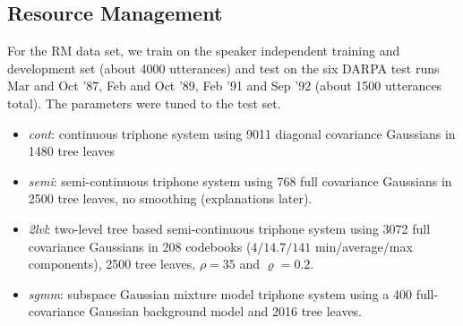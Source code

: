 \documentclass{article}
\begin{document}
\subsection{Resource Management}
For the RM data set, we train on the speaker independent training and development 
set (about 4000 utterances) and test on the six DARPA test runs Mar and Oct '87,
Feb and Oct '89, Feb '91 and Sep '92 (about 1500 utterances total).  The parameters 
were tuned to the test set.
%
\begin{itemize}
\item
  {\em cont}: continuous triphone system using 9011 diagonal covariance
  Gaussians in 1480 tree leaves
\item
  {\em semi}: semi-continuous triphone system using 768 full covariance
  Gaussians in 2500 tree leaves, no smoothing (explanations later).
\item
  {\em 2lvl}: two-level tree based semi-continuous triphone system using
  3072 full covariance Gaussians in 208 codebooks ($4/14.7/141$ min/average/max
  components), 2500 tree leaves, $\rho = 35$ and $\varrho = 0.2$.
\item
  {\em sgmm}: subspace Gaussian mixture model triphone system using a 400 
  full-covariance Gaussian background model and 2016 tree leaves.
\end{itemize}
\end{document}
